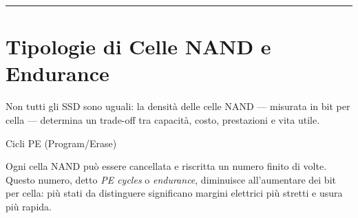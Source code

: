 \documentclass[
  italian,
  openany]{book}
\begin{document}
\begin{center}\rule{0.5\linewidth}{0.5pt}\end{center}

\section{Tipologie di Celle NAND e
Endurance}\label{tipologie-di-celle-nand-e-endurance}

Non tutti gli SSD sono uguali: la densità delle celle NAND --- misurata
in bit per cella --- determina un trade-off tra capacità, costo,
prestazioni e vita utile.

\begin{calloutdefinition}{Cicli PE (Program/Erase)}

Ogni cella NAND può essere cancellata e riscritta un numero finito di
volte. Questo numero, detto \emph{PE cycles} o \emph{endurance},
diminuisce all'aumentare dei bit per cella: più stati da distinguere
significano margini elettrici più stretti e usura più rapida.

\end{calloutdefinition}
\end{document}

